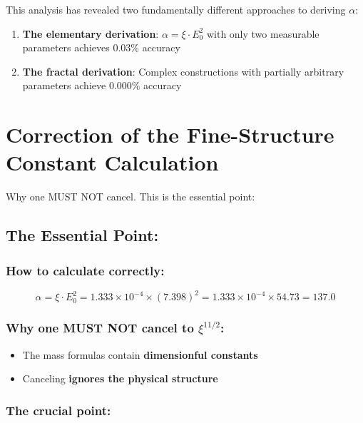 \documentclass[12pt,a4paper]{article}
\theoremstyle{definition}
\begin{document}
	This analysis has revealed two fundamentally different approaches to deriving $\alpha$:
	
	\begin{enumerate}
		\item \textbf{The elementary derivation}: $\alpha = \xi \cdot E_0^2$ with only two measurable parameters achieves $0.03\%$ accuracy
		\item \textbf{The fractal derivation}: Complex constructions with partially arbitrary parameters achieve $0.000\%$ accuracy
	\end{enumerate}
	
	\section{Correction of the Fine-Structure Constant Calculation}
	
	Why one MUST NOT cancel. This is the essential point:
	
	\subsection{The Essential Point:}
	
	\subsubsection{How to calculate correctly:}
	
	\begin{equation}
		\alpha = \xi \cdot E_0^2 = 1.333 \times 10^{-4} \times (7.398)^2 = 1.333 \times 10^{-4} \times 54.73 = 137.0
	\end{equation}
	
	\subsubsection{Why one MUST NOT cancel to $\xi^{11/2}$:}
	
	\begin{itemize}
		\item The mass formulas contain \textbf{dimensionful constants}
		\item Canceling \textbf{ignores the physical structure}
	\end{itemize}
	
	\subsubsection{The crucial point:}
	
\end{document}
